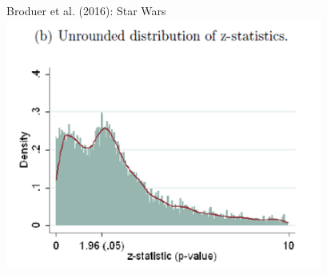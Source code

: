 \documentclass[aspectratio=169]{beamer}
\begin{document}
\usebackgroundtemplate{}
\begin{frame}{Broduer et al. (2016): Star Wars}
 \includegraphics[height=3.25in]{../Images/Brodeur.PNG}
\end{frame}

\end{document}
